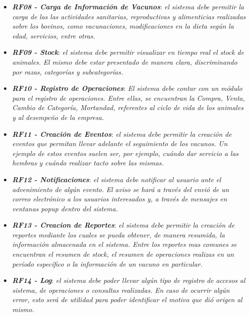 \documentclass[11pt,oneside]{book}
\begin{document}
\begin{itemize}
\item \textit{\textbf{RF08 - Carga de Información de Vacunos}}: \textit{el sistema debe permitir la carga de las las actividades sanitarias, reproductivas y alimenticias realizadas sobre los bovinos, como vacunaciones, modificaciones en la dieta según la edad, servicios, entre otras.}

\item \textit{\textbf{RF09 - Stock}}: \textit{el sistema debe permitir visualizar en tiempo real el stock de animales. El mismo debe estar presentado de manera clara, discriminando por razas, categorías y subcategorías.}

\item \textit{\textbf{RF10 - Registro de Operaciones}}: \textit{El sistema debe contar con un módulo para el registro de operaciones. Entre ellas, se encuentran la Compra, Venta, Cambio de Categoría, Mortandad, referentes al ciclo de vida de los animales y al desempeño de la empresa.}

\item \textit{\textbf{RF11 - Creación de Eventos}}: \textit{el sistema debe permitir la creación de eventos que permitan llevar adelante el seguimiento de los vacunos. Un ejemplo de estos eventos suelen ser, por ejemplo, cuándo dar servicio a las hembras y cuándo realizar tacto sobre las mismas.}

\item \textit{\textbf{RF12 - Notificaciones}}: \textit{el sistema debe notificar al usuario ante el advenimiento de algún evento. El aviso se hará a través del envió de un correo electrónico a los usuarios interesados y, a través de mensajes en ventanas popup dentro del sistema.}

\item \textit{\textbf{RF13 - Creacion de Reportes}}: \textit{el sistema debe permitir la creación de reportes mediante los cuales se pueda obtener, de manera resumida, la información almacenada en el sistema. Entre los reportes mas comunes se encuentran el resumen de stock, el resumen de operaciones realizas en un período específico o la información de un vacuno en particular.}

\item \textit{\textbf{RF14 - Log}}: \textit{el sistema debe poder llevar algún tipo de registro de accesos al sistema, de operaciones o consultas realizadas. En caso de ocurrir algún error, esto será de utilidad para poder identificar el motivo que dió origen al mismo.}
\end{itemize}
\end{document}
